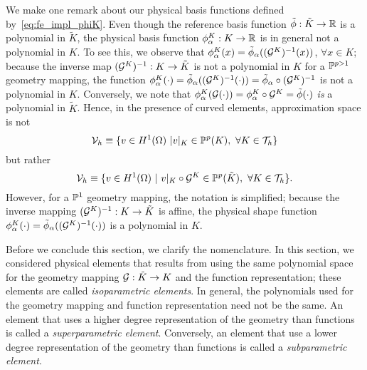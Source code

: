 We make one remark about our physical basis functions defined by~\eqref{eq:fe_impl_phiK}.  Even though the reference basis function $\tilde \phi: \tilde K \to \mathbb{R}$ is a polynomial in $\tilde K$, the physical basis function $\phi^K_\alpha: K \to \mathbb{R}$ is in general not a polynomial in $K$. To see this, we observe that $\phi^K_\alpha(x) = \tilde \phi_\alpha((\mathcal{G}^K)^{-1}(x))$, $\forall x \in K$; because the inverse map $(\mathcal{G}^K)^{-1}: K \to \tilde K$ is not a polynomial in $K$ for a $\mathbb{P}^{p>1}$ geometry mapping, the function $\phi^K_\alpha(\cdot) = \tilde \phi_\alpha((\mathcal{G}^K)^{-1}(\cdot)) = \tilde \phi_\alpha \circ (\mathcal{G}^K)^{-1}$ is not a polynomial in $K$.  Conversely, we note that $\phi^K_\alpha(\mathcal{G}(\cdot)) = \phi^K_\alpha \circ \mathcal{G}^K = \tilde \phi(\cdot)$ \emph{is} a polynomial in $\tilde K$. Hence, in the presence of curved elements, approximation space is not
\begin{equation*}
  \mathcal{V}_h \equiv \{ v \in H^1(\Omega) \ | v|_K \in \mathbb{P}^p(K), \ \forall K \in \mathcal{T}_h \}
\end{equation*}
but rather
\begin{equation*}
  \mathcal{V}_h \equiv \{ v \in H^1(\Omega) \ | \ v|_K \circ \mathcal{G}^K \in \mathbb{P}^p(\tilde K), \ \forall K \in \mathcal{T}_h \}.
\end{equation*}
However, for a $\mathbb{P}^1$ geometry mapping, the notation is simplified; because the inverse mapping $(\mathcal{G}^K)^{-1}: K \to \tilde K$ is affine, the physical shape function $\phi^K_\alpha(\cdot) = \tilde \phi_\alpha((\mathcal{G}^K)^{-1}(\cdot))$ is a polynomial in $K$.



Before we conclude this section, we clarify the nomenclature.  In this section, we considered physical elements that results from using the same polynomial space for the geometry mapping $\mathcal{G}: \tilde K \to K$ and the function representation; these elements are called \emph{isoparametric elements}. In general, the polynomials used for the geometry mapping and function representation need not be the same.   An element that uses a higher degree representation of the geometry than functions is called a \emph{superparametric element}. Conversely, an element that use a lower degree representation of the geometry than functions is called a \emph{subparametric element}.

